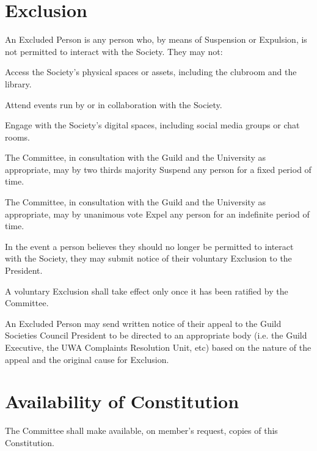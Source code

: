 \documentclass[a4paper]{article}
\begin{document}
\section{Exclusion} \label{sec:exclusion}
\begin{myEnumerate}
    \item An Excluded Person is any person who, by means of Suspension or Expulsion, is not permitted to interact with the Society. They may not:
        \begin{myEnumerate}
            \item Access the Society’s physical spaces or assets, including the clubroom and the library.
            \item Attend events run by or in collaboration with the Society.
            \item Engage with the Society’s digital spaces, including social media groups or chat rooms.
        \end{myEnumerate}
    \item The Committee, in consultation with the Guild and the University as appropriate, may by two thirds majority Suspend any person for a fixed period of time.
    \item The Committee, in consultation with the Guild and the University as appropriate, may by unanimous vote Expel any person for an indefinite period of time.
    \item In the event a person believes they should no longer be permitted to interact with the Society, they may submit notice of their voluntary Exclusion to the President.
        \begin{myEnumerate}
            \item A voluntary Exclusion shall take effect only once it has been ratified by the Committee.
        \end{myEnumerate}
    \item An Excluded Person may send written notice of their appeal to the Guild Societies Council President to be directed to an appropriate body (i.e. the Guild Executive, the UWA Complaints Resolution Unit, etc) based on the nature of the appeal and the original cause for Exclusion.
\end{myEnumerate}


\section{Availability of Constitution} \label{sec:availability}
\begin{myEnumerate}
    \item The Committee shall make available, on member's request, copies of this Constitution.
\end{myEnumerate}
\end{document}
